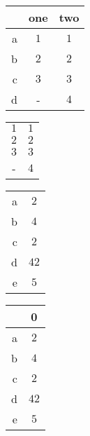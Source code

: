 \begin{table}[htp]
	\begin{center}
		\begin{tabular}{rcc}
		\toprule
			{} & {one} & {two}\\
			\midrule
			{a} & $1$ & $1$\\
			{b} & $2$ & $2$\\
			{c} & $3$ & $3$\\
			{d} & {-} & $4$\\
		\bottomrule
		\end{tabular}
	\end{center}
\end{table}
\begin{table}[htp]
	\begin{center}
		\begin{tabular}{cc}
		\toprule
                $1$ & $1$\\
		$2$ & $2$\\
		$3$ & $3$\\
		{-} & $4$\\
		\bottomrule
		\end{tabular}
	\end{center}
\end{table}
\begin{table}[htp]
	\begin{center}
		\begin{tabular}{rc}
		\toprule
			{a} & $2$\\
			{b} & $4$\\
			{c} & $2$\\
			{d} & $42$\\
			{e} & $5$\\
		\bottomrule
		\end{tabular}
	\end{center}
\end{table}
\begin{table}[htp]
	\begin{center}
		\begin{tabular}{rc}
		\toprule
			{} & {0}\\
			\midrule
			{a} & $2$\\
			{b} & $4$\\
			{c} & $2$\\
			{d} & $42$\\
			{e} & $5$\\
		\bottomrule
		\end{tabular}
	\end{center}
\end{table}